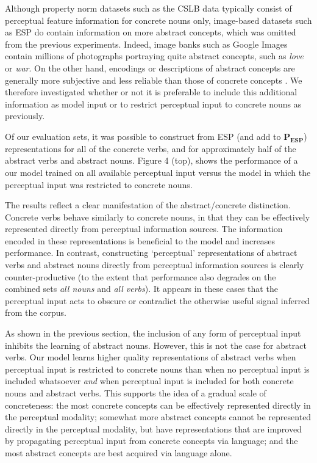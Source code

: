 \documentclass[11pt]{article}
\begin{document}
Although property norm datasets such as the CSLB data typically consist of perceptual feature information for concrete nouns only, image-based datasets such as ESP do contain information on more abstract concepts, which was omitted from the previous experiments. Indeed, image banks such as Google Images contain millions of photographs portraying quite abstract concepts, such as \emph{love} or \emph{war}. On the other hand, encodings or descriptions of abstract concepts are generally more subjective and less reliable than those of concrete concepts \cite{katja2005content}. We therefore investigated whether or not it is preferable to include this additional information as model input or to restrict perceptual input to concrete nouns as previously.    

Of our evaluation sets, it was possible to construct from ESP (and add to \(\mathbf{P_{ESP}}\)) representations for all of the concrete verbs, and for approximately half of the abstract verbs and abstract nouns. Figure 4 (top), shows the performance of a our model trained on all available perceptual input versus the model in which the perceptual input was restricted to concrete nouns. 

The results reflect a clear manifestation of the abstract/concrete distinction. Concrete verbs behave similarly to concrete nouns, in that they can be effectively represented directly from perceptual information sources. The information encoded in these representations is beneficial to the model and increases performance. In contrast, constructing `perceptual' representations of abstract verbs and abstract nouns directly from perceptual information sources is clearly counter-productive (to the extent that performance also degrades on the combined sets \emph{all nouns} and \emph{all verbs}). It appears in these cases that the perceptual input acts to obscure or contradict the otherwise useful signal inferred from the corpus.

As shown in the previous section, the inclusion of any form of perceptual input inhibits the learning of abstract nouns. However, this is not the case for abstract verbs. Our model learns higher quality representations of abstract verbs when perceptual input is restricted to concrete nouns than when no perceptual input is included whatsoever \emph{and} when perceptual input is included for both concrete nouns and abstract verbs. This supports the idea of a gradual scale of concreteness: the most concrete concepts can be effectively represented directly in the perceptual modality; somewhat more abstract concepts cannot be represented directly in the perceptual modality, but have representations that are improved by propagating perceptual input from concrete concepts via language; and the most abstract concepts are best acquired via language alone.   
\end{document}
